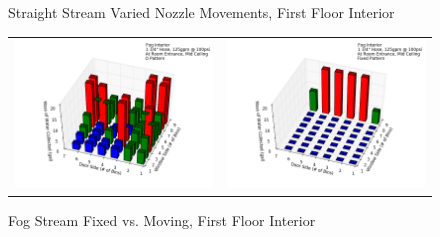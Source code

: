 \documentclass{article}
\begin{document}
\begin{appendices}
\begin{figure}[ht]
{\begin{tabular*}{\textwidth}{lr}
\end{tabular*}}
\centering
{}
\caption{Straight Stream Varied Nozzle Movements, First Floor Interior}
\label{fig:Straight Stream Varied Nozzle Movements, First Floor Interior}
\end{figure}

\begin{figure}[ht]
\begin{tabular*}{\textwidth}{lr}
\includegraphics[width=3.2in]{../ADD_Analysis/Figures/15-04-13_103117_Datafile_Fog_Interior.png} &
\includegraphics[width=3.2in]{../ADD_Analysis/Figures/15-12-09_104315_Datafile_Fog_Interior.png} \\
\end{tabular*}
\caption{Fog Stream Fixed vs. Moving, First Floor Interior}
\label{fig:Fog Stream Fixed vs. Moving, First Floor Interior}
\end{figure}


\end{appendices}
\end{document}
